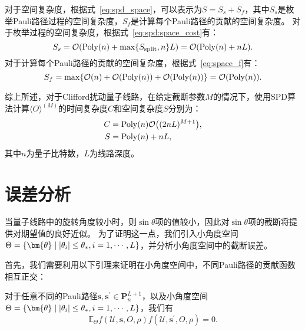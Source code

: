 对于空间复杂度，根据式~\eqref{eq:spd_space}，可以表示为$S = S_s+S_f$，其中$S_s$是枚举Pauli路径过程的空间复杂度，$S_f$是计算每个Pauli路径的贡献的空间复杂度。
对于枚举过程的空间复杂度，根据式~\eqref{eq:spd:space_cost}有：
\begin{equation}
    S_{s}=\order{\mathrm{Poly}(n)+\max\{S_{\text{split}},n\}L}=\order{\mathrm{Poly}(n)+nL}.
\end{equation}
对于计算每个Pauli路径的贡献的空间复杂度，根据式~\eqref{eq:space_f}有：
\begin{equation}
    S_f=\max\{\order{n}+\order{\poly(n)}+\order{\poly(n)}\}=\order{\poly(n)}.
\end{equation}


综上所述，对于Clifford扰动量子线路，在给定截断参数$M$的情况下，使用SPD算法计算$\langle O \rangle ^{(M)}$的时间复杂度$C$和空间复杂度$S$分别为：
\begin{equation}\label{eq:cpc:cost}
    \begin{aligned}
        C&=\mathrm{Poly}(n) \order{(2nL)^{M+1}},\\
        S&=\mathrm{Poly}(n)+nL,
    \end{aligned}
\end{equation}
其中$n$为量子比特数，$L$为线路深度。

\section{误差分析}
当量子线路中的旋转角度较小时，则$\sin{\theta}$项的值较小，因此对$\sin{\theta}$项的截断将提供对期望值的良好近似。
为了证明这一点，我们引入小角度空间$\Theta=\{\bm{\theta}\mid \abs{\theta_i}\leq \theta_* ,i=1,\cdots,L \}$，并分析小角度空间中的截断误差。



首先，我们需要利用以下引理来证明在小角度空间中，不同Pauli路径的贡献函数相互正交：
\begin{lemma}
对于任意不同的Pauli路径$\bm{s},\bm{s}^{\prime}\in \bm{P}^{L+1}_n$，以及小角度空间$\Theta=\{\bm{\theta}\mid \abs{\theta_i}\leq \theta_* ,i=1,\cdots,L \}$，我们有
\begin{equation}\label{ap:eq:E_cross_equals_0}
\mathbb{E}_{\Theta}f(\mathcal{U},\bm{s},O,\rho)f(\mathcal{U},\bm{s}^{\prime},O,\rho)=0.
\end{equation}
\end{lemma}

